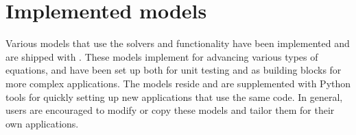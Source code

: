 \documentclass[letterpaper,10pt,english]{sphinxmanual}
\begin{document}
\section{Implemented models}
\label{\detokenize{Applications/ImplementedModels:implemented-models}}\label{\detokenize{Applications/ImplementedModels:chap-implementedmodels}}\label{\detokenize{Applications/ImplementedModels::doc}}
\sphinxAtStartPar
Various models that use the  solvers and functionality have been implemented and are shipped with .
These models implement  for advancing various types of equations, and have been set up both for unit testing and as building blocks for more complex applications.
The models reside  and are supplemented with Python tools for quickly setting up new applications that use the same code.
In general, users are encouraged to modify or copy these models and tailor them for their own applications.
\end{document}
